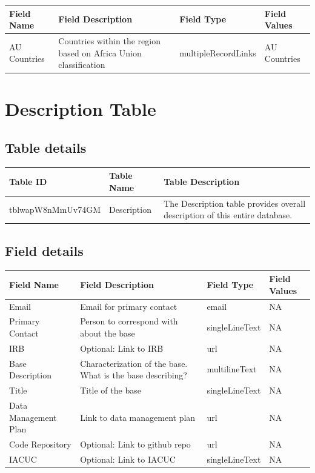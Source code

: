 \documentclass[
]{book}
\begin{document}
\begin{table}
\centering
\begin{tabular}{l|l|l|l}
\hline
\textbf{Field Name} & \textbf{Field Description} & \textbf{Field Type} & \textbf{Field Values}\\
\hline
AU Countries & Countries within the region based on Africa Union classification & multipleRecordLinks & AU Countries\\
\hline
\end{tabular}
\end{table}

\hypertarget{description-table}{%
\section{Description Table}\label{description-table}}

\hypertarget{table-details-3}{%
\subsection{Table details}\label{table-details-3}}

\begin{table}
\centering
\begin{tabular}{l|l|l}
\hline
\textbf{Table ID} & \textbf{Table Name} & \textbf{Table Description}\\
\hline
tblwapW8nMmUv74GM & Description & The Description table provides overall description of this entire database.\\
\hline
\end{tabular}
\end{table}

\hypertarget{field-details}{%
\subsection{Field details}\label{field-details}}

\begin{table}
\centering
\begin{tabular}{l|l|l|l}
\hline
\textbf{Field Name} & \textbf{Field Description} & \textbf{Field Type} & \textbf{Field Values}\\
\hline
Email & Email for primary contact & email & NA\\
\hline
Primary Contact & Person to correspond with about the base & singleLineText & NA\\
\hline
IRB & Optional: Link to IRB & url & NA\\
\hline
Base Description & Characterization of the base. What is the base describing? & multilineText & NA\\
\hline
Title & Title of the base & singleLineText & NA\\
\hline
Data Management Plan & Link to data management plan & url & NA\\
\hline
Code Repository & Optional: Link to github repo & url & NA\\
\hline
IACUC & Optional: Link to IACUC & singleLineText & NA\\
\hline
\end{tabular}
\end{table}
\end{document}
